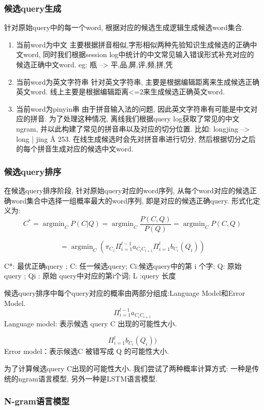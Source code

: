 \subsubsection{候选query生成}
针对原始query中的每一个word, 根据对应的候选生成逻辑生成候选word集合. 
\begin{enumerate}
\item 当前word为中文
主要根据拼音相似,字形相似两种先验知识生成候选的正确中文word, 同时我们根据session log中统计的中文常见输入错误形式补充对应的候选正确中文word. eg: 瓶 --> 平,品,屏,评,频,拼,凭

\item 当前word为英文字符串
针对英文字符串, 主要是根据编辑距离来生成候选正确英文word. 线上主要是根据编辑距离<=2来生成候选正确英文word. 

\item 当前word为pinyin串
由于拼音输入法的问题, 因此英文字符串有可能是中文对应的拼音. 为了处理这种情况, 离线我们根据query log获取了常见的中文ngram, 并以此构建了常见的拼音串以及对应的切分位置. 比如:  longjing --> long | jing \^A 253. 在线生成候选时会先对拼音串进行切分, 然后根据切分之后的每个拼音生成对应的候选中文word.
\end{enumerate}

\subsubsection{候选query排序}
在候选query排序阶段, 针对原始query对应的word序列, 从每个word对应的候选正确word集合中选择一组概率最大的word序列, 即是对应的候选正确query. 形式化定义为:
$$  C^* = \mathop{\arg\min}_C P(C|Q) = \mathop{\arg\min}_C \frac{P(C,Q)}{P(Q)} = \mathop{\arg\min}_C P(C,Q) $$

$$= \mathop{\arg\min}_C(\pi_{C_1}\Pi_{i=1}^{l-1}a_{{C_i}{C_{i+1}}}\Pi_{i=1}^{l}b_{C_i}(Q_i))  $$

C*: 最优正确query ; C: 任一候选query; Ci:候选query中的第 i 个字; 
Q: 原始 query ;  Qi : 原始 query中对应的第i个词;   L :query 长度   

候选query排序中每个query对应的概率由两部分组成:Language Model和Error Model.
$$ \Pi_{i=1}^{l-1}a_{{C_i}{C_{i+1}}} $$Language model: 表示候选 query C 出现的可能性大小. 

$$ \Pi_{i=1}^{l}b_{C_i}(Q_i)) $$ Error model：表示候选C 被错写成 Q 的可能性大小.

为了计算候选query C出现的可能性大小. 我们尝试了两种概率计算方式: 一种是传统的ngram语言模型, 另外一种是LSTM语言模型.

\subsubsection{N-gram语言模型}

